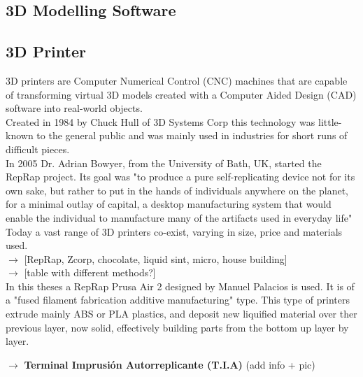 \subsection{3D Modelling Software}






\subsection{3D Printer}

3D printers are Computer Numerical Control (CNC) machines that are capable of transforming virtual 3D models created with a Computer Aided Design (CAD) software into real-world objects.\\

Created in 1984 by Chuck Hull of 3D Systems Corp this technology was little-known to the general public and was mainly used in industries for short runs of difficult pieces.\\
In 2005 Dr. Adrian Bowyer, from the University of Bath, UK, started the RepRap project. Its goal was "to produce a pure self-replicating device not for its own sake, but rather to put in the hands of individuals anywhere on the planet, for a minimal outlay of capital, a desktop manufacturing system that would enable the individual to manufacture many of the artifacts used in everyday life" \\

Today a vast range of 3D printers co-exist, varying in size, price and materials used. \\


$\rightarrow$ [RepRap, Zcorp, chocolate, liquid sint, micro, house building]\\

$\rightarrow$ [table with different methods?]\\

In this theses a RepRap Prusa Air 2 designed by Manuel Palacios is used. It is of a "fused filament fabrication additive manufacturing" type. This type of printers extrude mainly ABS or PLA plastics, and deposit new liquified material over ther previous layer, now solid, effectively building parts from the bottom up layer by layer.

$\rightarrow$ \textbf {Terminal Imprusión Autorreplicante (T.I.A) }
(add info + pic)




